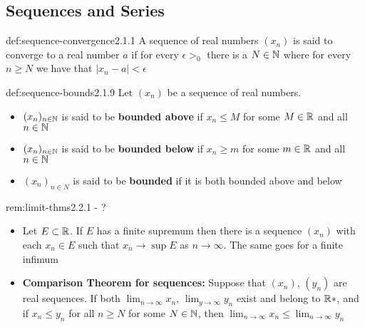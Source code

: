\documentclass[landscape, 8pt]{extarticle}
\begin{document}
\begin{multicols}{3}
\subsection*{Sequences and Series}

\begin{dfn}{def:sequence-convergence}{2.1.1}
A sequence of real numbers $(x_{n})$ is said to converge to a real number $a$ if for every $\epsilon>_{0}$ there is a $N\in \mathbb{N}$ where for every $n\ge N$ we have that $\lvert x_{n}- a \rvert < \epsilon $
\end{dfn}
\vspace{-5pt}

\begin{dfn}{def:sequence-bounds}{2.1.9}
Let $(x_{n})$ be a sequence of real numbers.
\vspace{-5pt}
\renewcommand\labelitemi{\tiny$\bullet$}
\begin{itemize}
    \setlength\itemsep{0em}
    \item $(x_{n})_{n\in \mathbb{N}}$ is said to be \textbf{bounded above} if $x_{n} \le M$ for some $M\in\mathbb{R}$ and all $n\in \mathbb{N}$
    \item $(x_{n})_{n\in \mathbb{N}}$ is said to be \textbf{bounded below} if $x_{n} \ge m$ for some $m\in\mathbb{R}$ and all $n\in \mathbb{N}$
    \item $(x_{n})_{n\in N}$ is said to be \textbf{bounded} if it is both bounded above and below
\end{itemize}
\end{dfn}
\vspace{-5pt}

\begin{rem}{rem:limit-thms}{2.2.1 - ?}
\renewcommand\labelitemi{\tiny$\bullet$}
\begin{itemize}
    \setlength\itemsep{0em}
    \item Let $E\subset \mathbb{R}$. If $E$ has a finite supremum then there is a sequence $(x_{n})$ with each $x_{n}\in E$ such that $x_{n}\to \sup E$ as $n\to \infty$. The same goes for a finite infimum
    \item \textbf{Comparison Theorem for sequences:} Suppose that $(x_{n})$, $(y_{n})$ are real sequences. If both $\lim_{n\to \infty} x_{n}$, $\lim_{y\to \infty} y_{n}$ exist and belong to $\mathbb{R}*$, and if $x_{n}\le y_{n}$ for all $n\ge N$ for some $N\in \mathbb{N}$, then $\lim_{n\to \infty} x_{n} \le \lim_{n\to \infty} y_{n}$
\end{itemize}
\end{rem}
\vspace{-5pt}


\end{multicols}
\end{document}

